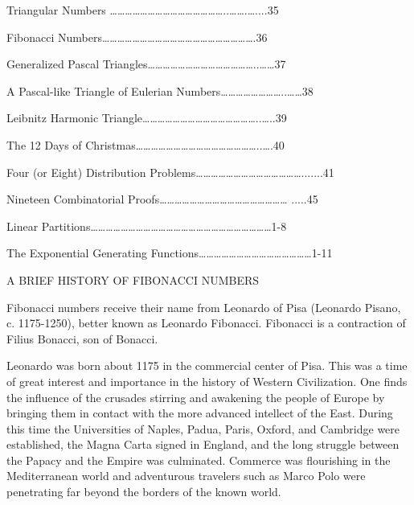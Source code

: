 \documentclass[10pt,letter]{article}
\begin{document}
Triangular Numbers
\ldots{}\ldots{}\ldots{}\ldots{}\ldots{}\ldots{}\ldots{}\ldots{}\ldots{}\ldots{}\ldots{}\ldots{}\ldots{}\ldots{}\ldots{}..\ldots{}\ldots{}.\ldots{}....35

Fibonacci
Numbers\ldots{}\ldots{}\ldots{}\ldots{}\ldots{}\ldots{}\ldots{}\ldots{}\ldots{}\ldots{}\ldots{}\ldots{}\ldots{}\ldots{}\ldots{}\ldots{}\ldots{}\ldots{}\ldots{}\ldots{}.36

Generalized Pascal
Triangles\ldots{}\ldots{}\ldots{}\ldots{}\ldots{}\ldots{}\ldots{}\ldots{}\ldots{}\ldots{}\ldots{}\ldots{}\ldots{}\ldots{}..\ldots{}\ldots{}37

A Pascal-like Triangle of Eulerian
Numbers\ldots{}\ldots{}\ldots{}\ldots{}\ldots{}\ldots{}\ldots{}\ldots{}..\ldots{}\ldots{}38

Leibnitz Harmonic
Triangle\ldots{}\ldots{}\ldots{}\ldots{}\ldots{}\ldots{}\ldots{}\ldots{}\ldots{}\ldots{}\ldots{}\ldots{}\ldots{}\ldots{}\ldots{}..\ldots{}..39

The 12 Days of
Christmas\ldots{}\ldots{}\ldots{}\ldots{}\ldots{}\ldots{}\ldots{}\ldots{}\ldots{}\ldots{}\ldots{}\ldots{}\ldots{}\ldots{}\ldots{}\ldots{}..\ldots{}.40

Four (or Eight) Distribution
Problems\ldots{}\ldots{}\ldots{}\ldots{}\ldots{}\ldots{}\ldots{}\ldots{}\ldots{}\ldots{}\ldots{}\ldots{}\ldots{}\ldots{}.......41

Nineteen Combinatorial
Proofs\ldots{}\ldots{}\ldots{}\ldots{}\ldots{}\ldots{}\ldots{}\ldots{}\ldots{}\ldots{}\ldots{}\ldots{}\ldots{}\ldots{}\ldots{}\ldots{}\ldots{}
.....45

Linear
Partitions\ldots{}\ldots{}\ldots{}\ldots{}\ldots{}\ldots{}\ldots{}\ldots{}\ldots{}\ldots{}\ldots{}\ldots{}\ldots{}\ldots{}\ldots{}\ldots{}\ldots{}\ldots{}\ldots{}\ldots{}\ldots{}\ldots{}\ldots{}\ldots{}1-8

The Exponential Generating
Functions\ldots{}\ldots{}\ldots{}\ldots{}\ldots{}\ldots{}\ldots{}\ldots{}\ldots{}\ldots{}\ldots{}\ldots{}\ldots{}\ldots{}\ldots{}1-11

A BRIEF HISTORY OF FIBONACCI NUMBERS

Fibonacci numbers receive their name from Leonardo of Pisa (Leonardo
Pisano, c. 1175-1250), better known as Leonardo Fibonacci. Fibonacci is
a contraction of Filius Bonacci, son of Bonacci.

Leonardo was born about 1175 in the commercial center of Pisa. This was
a time of great interest and importance in the history of Western
Civilization. One finds the influence of the crusades stirring and
awakening the people of Europe by bringing them in contact with the more
advanced intellect of the East. During this time the Universities of
Naples, Padua, Paris, Oxford, and Cambridge were established, the Magna
Carta signed in England, and the long struggle between the Papacy and
the Empire was culminated. Commerce was flourishing in the Mediterranean
world and adventurous travelers such as Marco Polo were penetrating far
beyond the borders of the known world.
\end{document}
